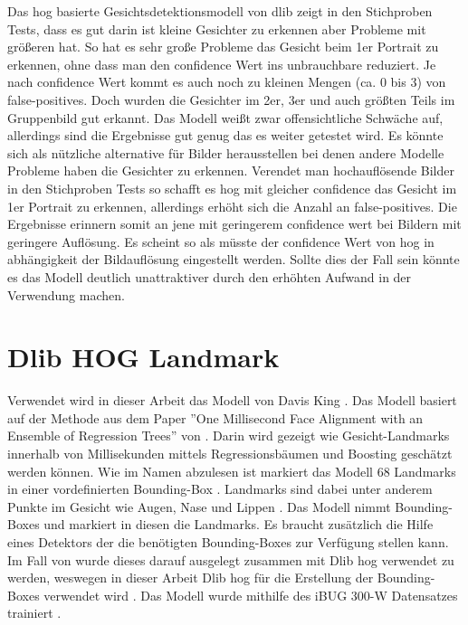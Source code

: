 Das \gls{hog} basierte Gesichtsdetektionsmodell von dlib zeigt in den Stichproben Tests, dass es gut darin ist kleine Gesichter zu erkennen aber Probleme mit größeren hat. So hat es sehr große Probleme das Gesicht beim 1er Portrait zu erkennen, ohne dass man den confidence Wert ins unbrauchbare reduziert. Je nach confidence Wert kommt es auch noch zu kleinen Mengen (ca. 0 bis 3) von false-positives. Doch wurden die Gesichter im 2er, 3er und auch größten Teils im Gruppenbild gut erkannt. Das Modell weißt zwar offensichtliche Schwäche auf, allerdings sind die Ergebnisse gut genug das es weiter getestet wird. Es könnte sich als nützliche alternative für Bilder herausstellen bei denen andere Modelle Probleme haben die Gesichter zu erkennen. Verendet man hochauflösende Bilder in den Stichproben Tests so schafft es \gls{hog} mit gleicher confidence das Gesicht im 1er Portrait zu erkennen, allerdings erhöht sich die Anzahl an false-positives. Die Ergebnisse erinnern somit an jene mit geringerem confidence wert bei Bildern mit geringere Auflösung. Es scheint so als müsste der confidence Wert von \gls{hog} in abhängigkeit der Bildauflösung eingestellt werden. Sollte dies der Fall sein könnte es das Modell deutlich unattraktiver durch den erhöhten Aufwand in der Verwendung machen.

\section{Dlib HOG Landmark}
Verwendet wird in dieser Arbeit das  Modell von Davis King \parencite{King24}. Das Modell basiert auf der Methode aus dem Paper ''One Millisecond Face Alignment with an Ensemble of Regression Trees'' von \cite{Kazemi2014} \parencite{faceLandmarkDetectionoD}. Darin wird gezeigt wie Gesicht-Landmarks innerhalb von Millisekunden mittels Regressionsbäumen und Boosting geschätzt werden können. Wie im Namen abzulesen ist markiert das Modell 68 Landmarks in einer vordefinierten Bounding-Box \parencite{DlibPythonoD}. Landmarks sind dabei unter anderem Punkte im Gesicht wie Augen, Nase und Lippen \parencite{faceLandmarkDetectionoD}. Das Modell nimmt Bounding-Boxes und markiert in diesen die Landmarks. 
Es braucht zusätzlich die Hilfe eines Detektors der die benötigten Bounding-Boxes zur Verfügung stellen kann. Im Fall von  wurde dieses darauf ausgelegt zusammen mit Dlib \gls{hog} verwendet zu werden, weswegen in dieser Arbeit Dlib \gls{hog} für die Erstellung der Bounding-Boxes verwendet wird \parencite{King24}. Das Modell wurde mithilfe des iBUG 300-W Datensatzes trainiert \parencite{King24, faceLandmarkDetectionoD}.

